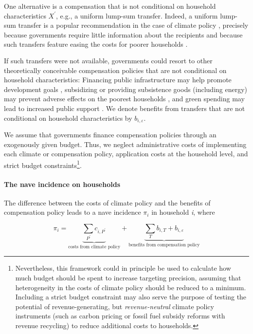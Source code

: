 \documentclass[12pt, a4paper]{article}
\begin{document}
One alternative is a compensation that is not conditional on household characteristics $X^{\prime}$, e.g., a uniform lump-sum transfer. Indeed, a uniform lump-sum transfer is a popular recommendation in the case of climate policy \autocite{Stiglitz.2017,Baranzini.2000,Metcalf.2009,Sager.2023}, precisely because governments require little information about the recipients and because such transfers feature easing the costs for poorer households \autocite{Budolfson.2021,vanderPloeg.2022}. 

If such transfers were not available, governments could resort to other theoretically conceivable compensation policies that are not conditional on household characteristics: Financing public infrastructure may help promote development goals \autocite{Franks.2018,Jakob.2016}, subsidizing or providing subsistence goods (including energy) may prevent adverse effects on the poorest households \autocite{Greve.2022,Schaffitzel.2019}, and green spending may lead to increased public support \autocite{Sommer.2022,Kotchen.2017,Dechezlepretre.2022}. We denote benefits from transfers that are not conditional on household characteristics by $b_{i,\varepsilon}$.

We assume that governments finance compensation policies through an exogenously given budget. Thus, we neglect administrative costs of implementing each climate or compensation policy, application costs at the household level, and strict budget constraints\footnote{Nevertheless, this framework could in principle be used to calculate how much budget should be spent to increase targeting precision, assuming that heterogeneity in the costs of climate policy should be reduced to a minimum. Including a strict budget constraint may also serve the purpose of testing the potential of revenue-generating, but \textit{revenue-neutral} climate policy instruments (such as carbon pricing or fossil fuel subsidy reforms with revenue recycling) to reduce additional costs to households.}. 

\paragraph{The nave incidence on households}
The difference between the costs of climate policy and the benefits of compensation policy leads to a nave incidence $\pi_{i}$ in household \textit{i}, where

\begin{equation} \label{eq:pi}
    \pi_{i} = \underbrace{\sum_{P^{\prime}} c_{i,P^{\prime}}}_{\text{costs from climate policy}} + \underbrace{\sum_{T} b_{i,T} + b_{i,\varepsilon}}_{\text{benefits from compensation policy}}
\end{equation}
\end{document}
